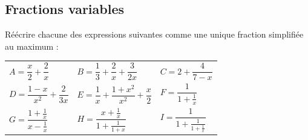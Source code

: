 \documentclass[oneside,12pt]{article}          %
\begin{document}
\subsection{Fractions variables}
Réécrire chacune des expressions suivantes comme une unique fraction simplifiée au maximum :

\renewcommand{\arraystretch}{2.8}
\begin{tabular}{p{} p{} p{}}
    $A=\dfrac{x}{2}+\dfrac{2}{x}$ & $B=\dfrac{1}{3}+\dfrac{2}{x}+\dfrac{3}{2x}$ & $C=2+\dfrac{4}{7-x}$ \\
    $D=\dfrac{1-x}{x^2}+\dfrac{2}{3x}$ & $E=\dfrac{1}{x}+\dfrac{1+x^2}{x^2}+\dfrac{x}{2}$ & $F=\dfrac{1}{1+\frac{1}{x}}$ \\
    $G=\dfrac{1+\frac{1}{x}}{x-\frac{1}{x}}$ & $H=\dfrac{x+\frac{1}{x}}{1+\frac{1}{1+x}}$ & $I=\dfrac{1}{1+\frac{1}{1+\frac{1}{x}}}$
\end{tabular}
\end{document}
